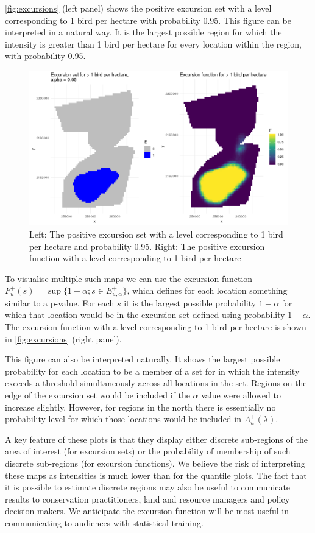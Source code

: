 \documentclass[preprint,12pt]{elsarticle}
\begin{document}
\autoref{fig:excursions} (left panel) shows the positive excursion set with a level corresponding to 1 bird per hectare with probability 0.95.  This figure can be interpreted in a natural way.  It is the largest possible region for which the intensity is greater than 1 bird per hectare for every location within the region, with probability 0.95.
\begin{figure}
	\includegraphics[scale=0.5]{figures/excursions.png}
	\caption{Left:  The positive excursion set with a level corresponding to 1 bird per hectare and probability 0.95.  Right: The positive excursion function with a level corresponding to 1 bird per hectare}
	\label{fig:excursions}
\end{figure}
To visualise multiple such maps we can use the excursion function $F_u^{+}(s) = \sup \{1 - \alpha ; s \in E_{u,\alpha}^+ \}$, which defines for each location something similar to a p-value.  For each $s$ it is the largest possible probability $1 -\alpha$ for which that location would be in the excursion set defined using probability $1 - \alpha$.  The excursion function with a level corresponding to 1 bird per hectare is shown in \autoref{fig:excursions} (right panel).

This figure can also be interpreted naturally.  It shows the largest possible probability for each location to be a member of a set for in which the intensity exceeds a threshold simultaneously across all locations in the set. Regions on the edge of the excursion set would be included if the $\alpha$ value were allowed to increase slightly.  However, for regions in the north there is essentially no probability level for which those locations would be included in $A_u^{+}(\lambda)$.

A key feature of these plots is that they display either discrete sub-regions of the area of interest (for excursion sets) or the probability of membership of such discrete sub-regions (for excursion functions).  We believe the risk of interpreting these maps as intensities is much lower than for the quantile plots.  The fact that it is possible to estimate discrete regions may also be useful to communicate results to conservation practitioners, land and resource managers and policy decision-makers.  We anticipate the excursion function will be most useful in communicating to audiences with statistical training. %
\end{document}
